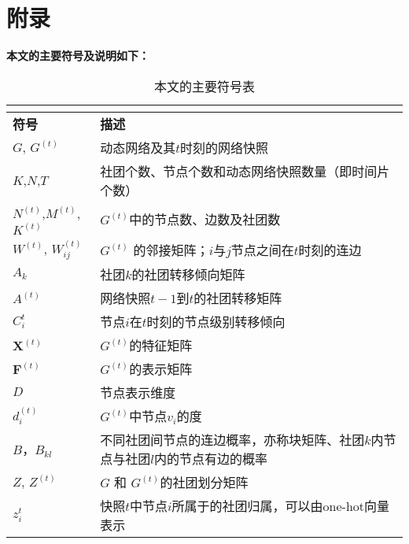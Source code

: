 
\appendix

\chapter*{附录}


\textbf{本文的主要符号及说明如下：}
\begin{center}
	\begin{longtable}{@{}lp{300pt}@{}}
		\caption{本文的主要符号表}\\
		\label{symbols:all}\\
			\hline
			{\bfseries 符号} &  { \bfseries 描述} \\
			\hline
			$G$, $G^{(t)}$ &  动态网络及其$t$时刻的网络快照 \\
			$K$,$N$,$T$ & 社团个数、节点个数和动态网络快照数量（即时间片个数） \\
			$N^{(t)}$,$M^{(t)}$, $K^{(t)}$ &  $G^{(t)}$中的节点数、边数及社团数 \\
			$W^{(t)}$, $W^{(t)}_{ij}$ &  $G^{(t)}$ 的邻接矩阵；$i$与$j$节点之间在$t$时刻的连边\\
			${A}_k$ & 社团$k$的社团转移倾向矩阵 \\
			$A^{(t)}$ &  网络快照$t-1$到$t$的社团转移矩阵 \\
			${C}_i^{t}$ & 节点$i$在$t$时刻的节点级别转移倾向\\
			$\mathbf{X}^{(t)}$ & $G^{(t)}$的特征矩阵 \\
			$\mathbf{F}^{(t)}$ & $G^{(t)}$的表示矩阵 \\
			$D$ & 节点表示维度 \\
			$d^{(t)}_i$ & $G^{(t)}$中节点$v_i$的度 \\
			$B$，$B_{kl}$ & 不同社团间节点的连边概率，亦称块矩阵、社团$k$内节点与社团$l$内的节点有边的概率\\
			$Z$, $Z^{(t)}$ & $G$ 和 $G^{(t)}$的社团划分矩阵 \\
			$z_i^{t}$ & 快照$t$中节点$i$所属于的社团归属，可以由one-hot向量表示 \\

\end{longtable}
\end{center}
